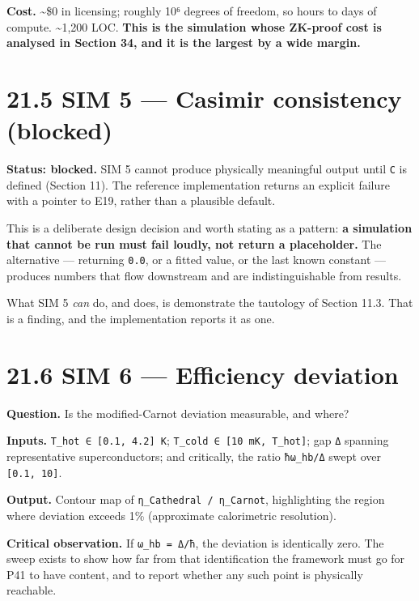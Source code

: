 \documentclass[
  11pt]{report}
\begin{document}
\textbf{Cost.} \textasciitilde\$0 in licensing; roughly 10⁶ degrees of
freedom, so hours to days of compute. \textasciitilde1,200 LOC.
\textbf{This is the simulation whose ZK-proof cost is analysed in
Section 34, and it is the largest by a wide margin.}

\hypertarget{sim-5-casimir-consistency-blocked}{%
\section{21.5 SIM 5 --- Casimir consistency
(blocked)}\label{sim-5-casimir-consistency-blocked}}

\textbf{Status: blocked.} SIM 5 cannot produce physically meaningful
output until \texttt{C} is defined (Section 11). The reference
implementation returns an explicit failure with a pointer to E19, rather
than a plausible default.

This is a deliberate design decision and worth stating as a pattern:
\textbf{a simulation that cannot be run must fail loudly, not return a
placeholder.} The alternative --- returning \texttt{0.0}, or a fitted
value, or the last known constant --- produces numbers that flow
downstream and are indistinguishable from results.

What SIM 5 \emph{can} do, and does, is demonstrate the tautology of
Section 11.3. That is a finding, and the implementation reports it as
one.

\hypertarget{sim-6-efficiency-deviation}{%
\section{21.6 SIM 6 --- Efficiency
deviation}\label{sim-6-efficiency-deviation}}

\textbf{Question.} Is the modified-Carnot deviation measurable, and
where?

\textbf{Inputs.} \texttt{T\_hot\ ∈\ {[}0.1,\ 4.2{]}\ K};
\texttt{T\_cold\ ∈\ {[}10\ mK,\ T\_hot{]}}; gap \texttt{Δ} spanning
representative superconductors; and critically, the ratio
\texttt{ħω\_hb/Δ} swept over \texttt{{[}0.1,\ 10{]}}.

\textbf{Output.} Contour map of \texttt{η\_Cathedral\ /\ η\_Carnot},
highlighting the region where deviation exceeds 1\% (approximate
calorimetric resolution).

\textbf{Critical observation.} If \texttt{ω\_hb\ =\ Δ/ħ}, the deviation
is identically zero. The sweep exists to show how far from that
identification the framework must go for P41 to have content, and to
report whether any such point is physically reachable.
\end{document}
